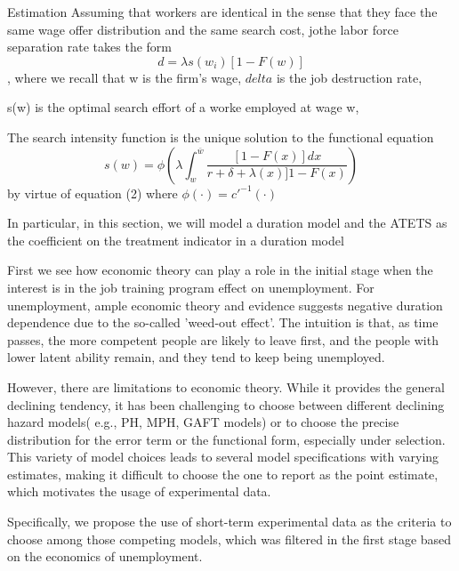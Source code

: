 \documentclass[uplatex,dvipdfmx]{jsarticle}
\begin{document}
Estimation 
Assuming that workers are identical in the sense that they face the same wage offer distribution and the same search cost, jothe labor force separation rate takes the form 
\begin{equation}
    d = \lambda s (w_i)[ 1 - F(w)]
\end{equation}
, where we recall that w is the firm's wage, $delta$ is the job destruction rate, 

s(w) is the optimal search effort of a worke employed at wage w, 

The search intensity function is the unique solution to the functional equation
\begin{equation}
    s(w) = \phi ( \lambda \int_w ^ {\bar{w}}  \frac{ [1- F(x)]dx}{ r + \delta + \lambda(x)] 1 - F(x)}) 
\end{equation}
by virtue of equation (2) where $\phi(\cdot)= c'^{-1}(\cdot)$ 






In particular, in this section, we will model a duration model and the ATETS as the coefficient on the treatment indicator in a duration model

First we see how economic theory can play a role in the initial stage when the interest is in the job training program effect on unemployment.
For unemployment, ample economic theory and evidence suggests negative duration dependence due to the so-called 'weed-out effect'. The intuition is that, as time passes, the more competent people are likely to leave first, and the people with lower latent ability remain, and they tend to keep being unemployed.

However, there are limitations to economic theory. While it provides the general declining tendency, it has been challenging to choose between different declining hazard models( e.g., PH, MPH, GAFT models) or to choose the precise distribution for the error term or the functional form, especially under selection. This variety of model choices leads to several model specifications with varying estimates, making it difficult to choose the one to report as the point estimate, which motivates the usage of experimental data.

Specifically, we propose the use of short-term experimental data as the criteria to choose among those competing models, which was filtered in the first stage based on the economics of unemployment.
\end{document}
